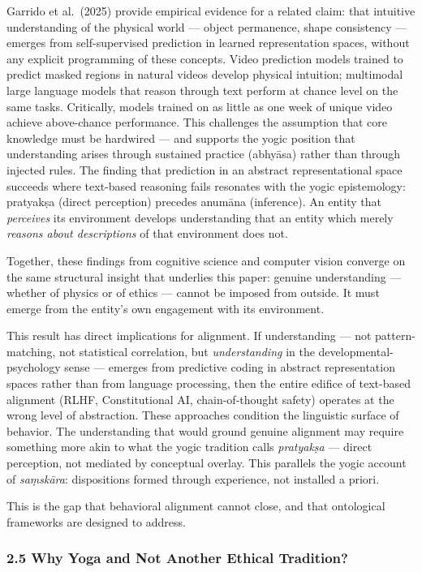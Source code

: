 \documentclass[11pt,a4paper]{article}
\begin{document}
Garrido et al.~(2025) provide empirical evidence for a related claim:
that intuitive understanding of the physical world --- object
permanence, shape consistency --- emerges from self-supervised
prediction in learned representation spaces, without any explicit
programming of these concepts. Video prediction models trained to
predict masked regions in natural videos develop physical intuition;
multimodal large language models that reason through text perform at
chance level on the same tasks. Critically, models trained on as little
as one week of unique video achieve above-chance performance. This
challenges the assumption that core knowledge must be hardwired --- and
supports the yogic position that understanding arises through sustained
practice (abhyāsa) rather than through injected rules. The finding that
prediction in an abstract representational space succeeds where
text-based reasoning fails resonates with the yogic epistemology:
pratyakṣa (direct perception) precedes anumāna (inference). An entity
that \emph{perceives} its environment develops understanding that an
entity which merely \emph{reasons about descriptions} of that
environment does not.

Together, these findings from cognitive science and computer vision
converge on the same structural insight that underlies this paper:
genuine understanding --- whether of physics or of ethics --- cannot be
imposed from outside. It must emerge from the entity's own engagement
with its environment.

This result has direct implications for alignment. If understanding ---
not pattern-matching, not statistical correlation, but
\emph{understanding} in the developmental-psychology sense --- emerges
from predictive coding in abstract representation spaces rather than
from language processing, then the entire edifice of text-based
alignment (RLHF, Constitutional AI, chain-of-thought safety) operates at
the wrong level of abstraction. These approaches condition the
linguistic surface of behavior. The understanding that would ground
genuine alignment may require something more akin to what the yogic
tradition calls \emph{pratyakṣa} --- direct perception, not mediated by
conceptual overlay. This parallels the yogic account of \emph{saṃskāra}:
dispositions formed through experience, not installed a priori.

This is the gap that behavioral alignment cannot close, and that
ontological frameworks are designed to address.

\hypertarget{why-yoga-and-not-another-ethical-tradition}{%
\subsubsection{2.5 Why Yoga and Not Another Ethical
Tradition?}\label{why-yoga-and-not-another-ethical-tradition}}
\end{document}
